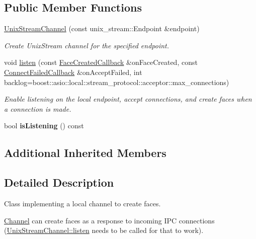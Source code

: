 \subsection*{Public Member Functions}
\begin{DoxyCompactItemize}
\item 
\hyperlink{classnfd_1_1UnixStreamChannel_a732ad8738a8c8528c6d1bfd7efad1f9f}{Unix\+Stream\+Channel} (const unix\+\_\+stream\+::\+Endpoint \&endpoint)
\begin{DoxyCompactList}\small\item\em Create Unix\+Stream channel for the specified endpoint. \end{DoxyCompactList}\item 
void \hyperlink{classnfd_1_1UnixStreamChannel_a384797f0d08b3dee389b62703ebe45c6}{listen} (const \hyperlink{classnfd_1_1Channel_a47f1a8874228ad9dfa38b4e96f6f8d57}{Face\+Created\+Callback} \&on\+Face\+Created, const \hyperlink{classnfd_1_1Channel_a090bac376b438fb150ce740c2839375b}{Connect\+Failed\+Callback} \&on\+Accept\+Failed, int backlog=boost\+::asio\+::local\+::stream\+\_\+protocol\+::acceptor\+::max\+\_\+connections)
\begin{DoxyCompactList}\small\item\em Enable listening on the local endpoint, accept connections, and create faces when a connection is made. \end{DoxyCompactList}\item 
bool {\bfseries is\+Listening} () const\hypertarget{classnfd_1_1UnixStreamChannel_a7d2ad099926fa094fa17b65fc4865e38}{}\label{classnfd_1_1UnixStreamChannel_a7d2ad099926fa094fa17b65fc4865e38}

\end{DoxyCompactItemize}
\subsection*{Additional Inherited Members}


\subsection{Detailed Description}
Class implementing a local channel to create faces. 

\hyperlink{classnfd_1_1Channel}{Channel} can create faces as a response to incoming I\+PC connections (\hyperlink{classnfd_1_1UnixStreamChannel_a384797f0d08b3dee389b62703ebe45c6}{Unix\+Stream\+Channel\+::listen} needs to be called for that to work). 

